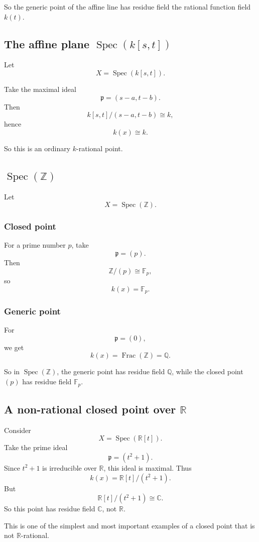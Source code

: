 \documentclass[12pt,a4paper]{article}
\theoremstyle{notespace}
\newcommand{\Spec}{\operatorname{Spec}}
\newcommand{\Frac}{\operatorname{Frac}}
\newcommand{\Z}{\mathbb Z}
\newcommand{\Q}{\mathbb Q}
\newcommand{\R}{\mathbb R}
\newcommand{\C}{\mathbb C}
\newcommand{\F}{\mathbb F}
\newcommand{\p}{\mathfrak p}
\theoremstyle{definition}
\begin{document}
	So the generic point of the affine line has residue field the rational function field \(k(t)\).
	
	\subsection{The affine plane \(\Spec(k[s,t])\)}
	
	Let
	\[
	X=\Spec(k[s,t]).
	\]
	
	Take the maximal ideal
	\[
	\p=(s-a,t-b).
	\]
	Then
	\[
	k[s,t]/(s-a,t-b)\cong k,
	\]
	hence
	\[
	k(x)\cong k.
	\]
	
	So this is an ordinary \(k\)-rational point.
	
	\subsection{\(\Spec(\Z)\)}
	
	Let
	\[
	X=\Spec(\Z).
	\]
	
	\subsubsection{Closed point}
	
	For a prime number \(p\), take
	\[
	\p=(p).
	\]
	Then
	\[
	\Z/(p)\cong \F_p,
	\]
	so
	\[
	k(x)=\F_p.
	\]
	
	\subsubsection{Generic point}
	
	For
	\[
	\p=(0),
	\]
	we get
	\[
	k(x)=\Frac(\Z)=\Q.
	\]
	
	So in \(\Spec(\Z)\), the generic point has residue field \(\Q\), while the closed point \((p)\) has residue field \(\F_p\).
	
	\subsection{A non-rational closed point over \(\R\)}
	
	Consider
	\[
	X=\Spec(\R[t]).
	\]
	Take the prime ideal
	\[
	\p=(t^2+1).
	\]
	Since \(t^2+1\) is irreducible over \(\R\), this ideal is maximal. Thus
	\[
	k(x)=\R[t]/(t^2+1).
	\]
	But
	\[
	\R[t]/(t^2+1)\cong \C.
	\]
	So this point has residue field \(\C\), not \(\R\).
	
	This is one of the simplest and most important examples of a closed point that is not \(\R\)-rational.
	
\end{document}
